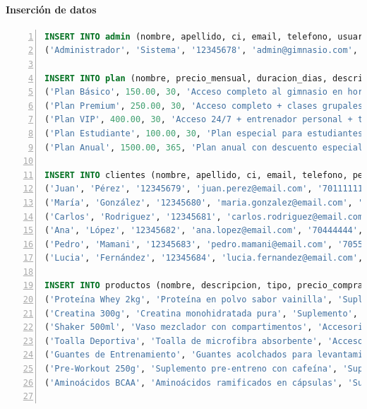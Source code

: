 \documentclass[12pt, letterpaper]{article}
\begin{document}
\newpage

\paragraph{Inserción de datos}
\begin{lstlisting}[language=SQL, numbers=left]
INSERT INTO admin (nombre, apellido, ci, email, telefono, usuario, contraseña) VALUES 
('Administrador', 'Sistema', '12345678', 'admin@gimnasio.com', '70123456', 'admin', 'admin');

INSERT INTO plan (nombre, precio_mensual, duracion_dias, descripcion) VALUES
('Plan Básico', 150.00, 30, 'Acceso completo al gimnasio en horarios regulares'),
('Plan Premium', 250.00, 30, 'Acceso completo + clases grupales + nutricionista'),
('Plan VIP', 400.00, 30, 'Acceso 24/7 + entrenador personal + todas las amenidades'),
('Plan Estudiante', 100.00, 30, 'Plan especial para estudiantes con descuento'),
('Plan Anual', 1500.00, 365, 'Plan anual con descuento especial');

INSERT INTO clientes (nombre, apellido, ci, email, telefono, peso, observacion, estado) VALUES
('Juan', 'Pérez', '12345679', 'juan.perez@email.com', '70111111', 75.50, 'Cliente nuevo, objetivos: pérdida de peso', 'ACTIVO'),
('María', 'González', '12345680', 'maria.gonzalez@email.com', '70222222', 62.00, 'Experiencia previa en fitness', 'ACTIVO'),
('Carlos', 'Rodriguez', '12345681', 'carlos.rodriguez@email.com', '70333333', 85.20, 'Enfoque en ganar masa muscular', 'ACTIVO'),
('Ana', 'López', '12345682', 'ana.lopez@email.com', '70444444', 58.75, 'Rehabilitación de lesión de rodilla', 'ACTIVO'),
('Pedro', 'Mamani', '12345683', 'pedro.mamani@email.com', '70555555', 90.00, 'Cliente avanzado', 'ACTIVO'),
('Lucia', 'Fernández', '12345684', 'lucia.fernandez@email.com', '70666666', 55.30, NULL, 'INACTIVO');

INSERT INTO productos (nombre, descripcion, tipo, precio_compra, precio_venta, stock, activo) VALUES
('Proteína Whey 2kg', 'Proteína en polvo sabor vainilla', 'Suplemento', 180.00, 250.00, 25, 'ACTIVO'),
('Creatina 300g', 'Creatina monohidratada pura', 'Suplemento', 80.00, 120.00, 15, 'ACTIVO'),
('Shaker 500ml', 'Vaso mezclador con compartimentos', 'Accesorio', 15.00, 35.00, 50, 'ACTIVO'),
('Toalla Deportiva', 'Toalla de microfibra absorbente', 'Accesorio', 25.00, 45.00, 30, 'ACTIVO'),
('Guantes de Entrenamiento', 'Guantes acolchados para levantamiento', 'Accesorio', 35.00, 65.00, 20, 'ACTIVO'),
('Pre-Workout 250g', 'Suplemento pre-entreno con cafeína', 'Suplemento', 90.00, 150.00, 12, 'ACTIVO'),
('Aminoácidos BCAA', 'Aminoácidos ramificados en cápsulas', 'Suplemento', 70.00, 110.00, 8, 'INACTIVO');


\end{lstlisting}
\end{document}
